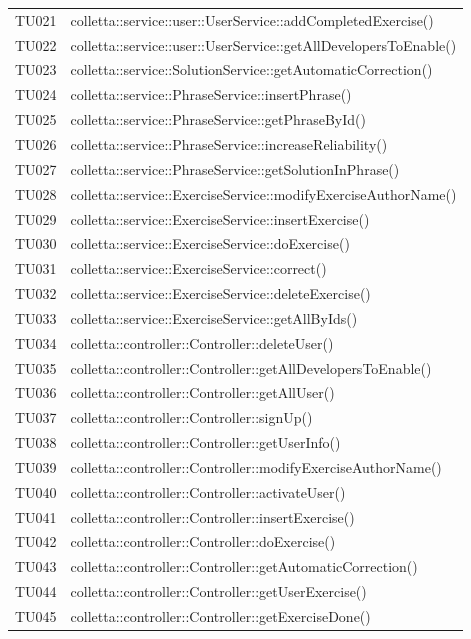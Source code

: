 \begin{tabularx}{\textwidth}{cX}
	TU021 & colletta::service::user::UserService::addCompletedExercise() \\
	TU022 & colletta::service::user::UserService::getAllDevelopersToEnable() \\
	TU023 & colletta::service::SolutionService::getAutomaticCorrection() \\
	TU024 & colletta::service::PhraseService::insertPhrase() \\
	TU025 & colletta::service::PhraseService::getPhraseById() \\
	TU026 & colletta::service::PhraseService::increaseReliability() \\
	TU027 & colletta::service::PhraseService::getSolutionInPhrase() \\
	TU028 & colletta::service::ExerciseService::modifyExerciseAuthorName() \\
	TU029 & colletta::service::ExerciseService::insertExercise() \\
	TU030 & colletta::service::ExerciseService::doExercise() \\
	TU031 & colletta::service::ExerciseService::correct() \\
	TU032 & colletta::service::ExerciseService::deleteExercise() \\
	TU033 & colletta::service::ExerciseService::getAllByIds() \\
	TU034 & colletta::controller::Controller::deleteUser() \\
	TU035 & colletta::controller::Controller::getAllDevelopersToEnable() \\
	TU036 & colletta::controller::Controller::getAllUser() \\
	TU037 & colletta::controller::Controller::signUp() \\
	TU038 & colletta::controller::Controller::getUserInfo() \\
	TU039 & colletta::controller::Controller::modifyExerciseAuthorName() \\
	TU040 & colletta::controller::Controller::activateUser() \\
	TU041 & colletta::controller::Controller::insertExercise() \\
	TU042 & colletta::controller::Controller::doExercise() \\
	TU043 & colletta::controller::Controller::getAutomaticCorrection() \\
	TU044 & colletta::controller::Controller::getUserExercise() \\
	TU045 & colletta::controller::Controller::getExerciseDone() \\

\end{tabularx}
